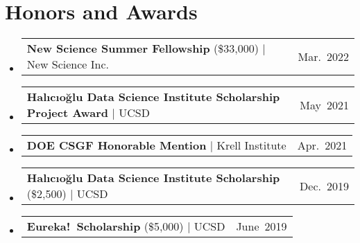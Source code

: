\documentclass[letterpaper,11pt]{article}
\makeatletter
\newcommand{\entry}[3]{
  \vspace{-2pt}
  \item
    \begin{tabular*}
      {0.97\textwidth} %
      {l@{\extracolsep{\fill}}r} %
      {\small \textbf{#1} #2}  %
      & {\footnotesize{#3}} \\  %
    \end{tabular*}
    \vspace{-7pt}
}
\newcommand{\resumeItem}[1]{
  \item
  \begin{minipage}[t]{0.7\textwidth}
    \small #1 
  \end{minipage}
}
\newcommand{\resumeSubHeadingListStart}{
  \begin{itemize}[leftmargin=0.15in, label={}]
}
\newcommand{\resumeSubHeadingListEnd}{
  \end{itemize}
}
\newcommand{\resumeItemListStart}{
  \begin{itemize}[itemsep=.5pt]
}
\newcommand{\resumeItemListEnd}{
  \end{itemize}
  \vspace{-2pt}
}
\makeatother
\begin{document}
\section{Honors and Awards}

\resumeSubHeadingListStart

\entry
{New Science Summer Fellowship}
{(\$33,000) $|$ New Science Inc.}
{Mar.\ 2022}

\entry
{Halıcıoğlu Data Science Institute Scholarship Project Award}
{$|$ UCSD}
{May\ 2021}

\entry
{DOE CSGF Honorable Mention}
{$|$ Krell Institute}
{Apr.\ 2021}

\entry
{Halıcıoğlu Data Science Institute Scholarship}
{(\$2,500) $|$ UCSD}
{Dec.\ 2019}

\entry
{Eureka!\ Scholarship}
{(\$5,000) $|$ UCSD}
{June\ 2019}

\resumeSubHeadingListEnd






\end{document}
